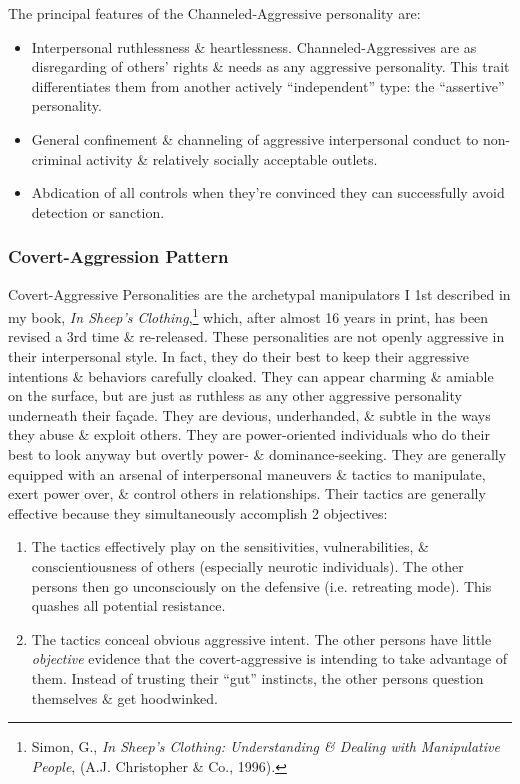 \documentclass{article}
\numberwithin{equation}{section}
\begin{document}
The principal features of the Channeled-Aggressive personality are:
\begin{itemize}
	\item Interpersonal ruthlessness \& heartlessness. Channeled-Aggressives are as disregarding of others' rights \& needs as any aggressive personality. This trait differentiates them from another actively ``independent'' type: the ``assertive'' personality.
	\item General confinement \& channeling of aggressive interpersonal conduct to non-criminal activity \& relatively socially acceptable outlets.
	\item Abdication of all controls when they're convinced they can successfully avoid detection or sanction.
\end{itemize}

\subsubsection{Covert-Aggression Pattern}
Covert-Aggressive Personalities are the archetypal manipulators I 1st described in my book, \textit{In Sheep's Clothing},\footnote{Simon, G., \textit{In Sheep's Clothing: Understanding \& Dealing with Manipulative People}, (A.J. Christopher \& Co., 1996).} which, after almost 16 years in print, has been revised a 3rd time \& re-released. These personalities are not openly aggressive in their interpersonal style. In fact, they do their best to keep their aggressive intentions \& behaviors carefully cloaked. They can appear charming \& amiable on the surface, but are just as ruthless as any other aggressive personality underneath their fa\c{c}ade. They are devious, underhanded, \& subtle in the ways they abuse \& exploit others. They are power-oriented individuals who do their best to look anyway but overtly power- \& dominance-seeking. They are generally equipped with an arsenal of interpersonal maneuvers \& tactics to manipulate, exert power over, \& control others in relationships. Their tactics are generally effective because they simultaneously accomplish 2 objectives:
\begin{enumerate}
	\item The tactics effectively play on the sensitivities, vulnerabilities, \& conscientiousness of others (especially neurotic individuals). The other persons then go unconsciously on the defensive (i.e. retreating mode). This quashes all potential resistance.
	\item The tactics conceal obvious aggressive intent. The other persons have little \textit{objective} evidence that the covert-aggressive is intending to take advantage of them. Instead of trusting their ``gut'' instincts, the other persons question themselves \& get hoodwinked.
\end{enumerate}
\end{document}
